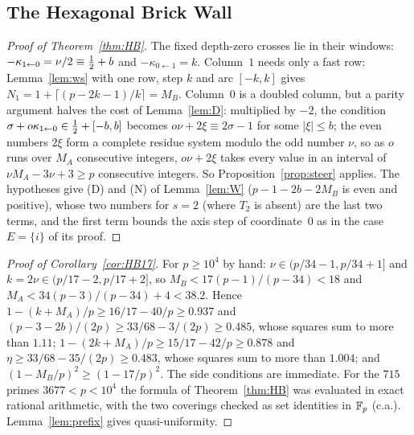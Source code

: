 \subsection{The Hexagonal Brick Wall}\label{app:HBproof}
\begin{proof}[Proof of Theorem~\ref{thm:HB}]
The fixed depth-zero crosses lie in their windows: $-\kappa_{1\leftarrow0}=\nu/2\equiv\tfrac12+b$ and $-\kappa_{0\leftarrow1}=k$. Column~$1$ needs only a fast row: Lemma~\ref{lem:ws} with one row, step $k$ and arc $[-k,k]$ gives $N_1=1+\lceil(p-2k-1)/k\rceil=M_B$. Column~$0$ is a doubled column, but a parity argument halves the cost of Lemma~\ref{lem:D}: multiplied by $-2$, the condition $\sigma+o\kappa_{1\leftarrow0}\in\tfrac12+[-b,b]$ becomes $o\nu+2\xi\equiv2\sigma-1$ for some $|\xi|\le b$; the even numbers $2\xi$ form a complete residue system modulo the odd number $\nu$, so as $o$ runs over $M_A$ consecutive integers, $o\nu+2\xi$ takes every value in an interval of $\nu M_A-3\nu+3\ge p$ consecutive integers. So Proposition~\ref{prop:steer} applies. The hypotheses give (D) and (N) of Lemma~\ref{lem:W} ($p-1-2b-2M_B$ is even and positive), whose two numbers for $s=2$ (where $T_2$ is absent) are the last two terms, and the first term bounds the axis step of coordinate~$0$ as in the case $E=\{i\}$ of its proof.
\end{proof}

\begin{proof}[Proof of Corollary~\ref{cor:HB17}]
For $p\ge10^4$ by hand: $\nu\in(p/34-1,p/34+1]$ and $k=2\nu\in(p/17-2,p/17+2]$, so $M_B<17(p-1)/(p-34)<18$ and $M_A<34(p-3)/(p-34)+4<38.2$. Hence $1-(k+M_A)/p\ge16/17-40/p\ge0.937$ and $(p-3-2b)/(2p)\ge33/68-3/(2p)\ge0.485$, whose squares sum to more than $1.11$; $1-(2k+M_A)/p\ge15/17-42/p\ge0.878$ and $\eta\ge33/68-35/(2p)\ge0.483$, whose squares sum to more than $1.004$; and $(1-M_B/p)^2\ge(1-17/p)^2$. The side conditions are immediate. For the $715$ primes $3677<p<10^4$ the formula of Theorem~\ref{thm:HB} was evaluated in exact rational arithmetic, with the two coverings checked as set identities in $\mathbb{F}_p$ (c.a.). Lemma~\ref{lem:prefix} gives quasi-uniformity.
\end{proof}

